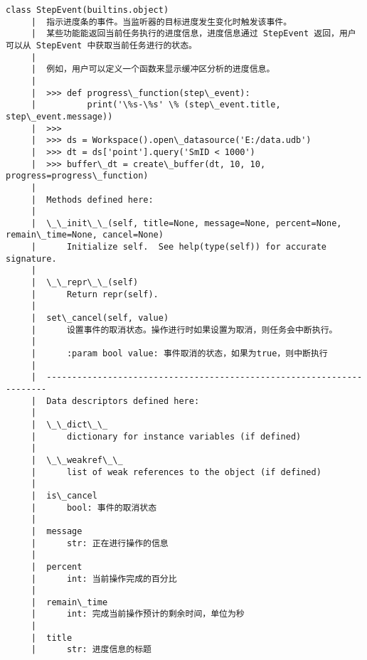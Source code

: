 \documentclass[11pt]{article}
\begin{document}
\begin{Verbatim}[commandchars=\\\{\}]
    class StepEvent(builtins.object)
     |  指示进度条的事件。当监听器的目标进度发生变化时触发该事件。
     |  某些功能能返回当前任务执行的进度信息，进度信息通过 StepEvent 返回，用户可以从 StepEvent 中获取当前任务进行的状态。
     |  
     |  例如，用户可以定义一个函数来显示缓冲区分析的进度信息。
     |  
     |  >>> def progress\_function(step\_event):
     |          print('\%s-\%s' \% (step\_event.title, step\_event.message))
     |  >>>
     |  >>> ds = Workspace().open\_datasource('E:/data.udb')
     |  >>> dt = ds['point'].query('SmID < 1000')
     |  >>> buffer\_dt = create\_buffer(dt, 10, 10, progress=progress\_function)
     |  
     |  Methods defined here:
     |  
     |  \_\_init\_\_(self, title=None, message=None, percent=None, remain\_time=None, cancel=None)
     |      Initialize self.  See help(type(self)) for accurate signature.
     |  
     |  \_\_repr\_\_(self)
     |      Return repr(self).
     |  
     |  set\_cancel(self, value)
     |      设置事件的取消状态。操作进行时如果设置为取消，则任务会中断执行。
     |      
     |      :param bool value: 事件取消的状态，如果为true，则中断执行
     |  
     |  ----------------------------------------------------------------------
     |  Data descriptors defined here:
     |  
     |  \_\_dict\_\_
     |      dictionary for instance variables (if defined)
     |  
     |  \_\_weakref\_\_
     |      list of weak references to the object (if defined)
     |  
     |  is\_cancel
     |      bool: 事件的取消状态
     |  
     |  message
     |      str: 正在进行操作的信息
     |  
     |  percent
     |      int: 当前操作完成的百分比
     |  
     |  remain\_time
     |      int: 完成当前操作预计的剩余时间，单位为秒
     |  
     |  title
     |      str: 进度信息的标题
    

\end{Verbatim}
\end{document}
